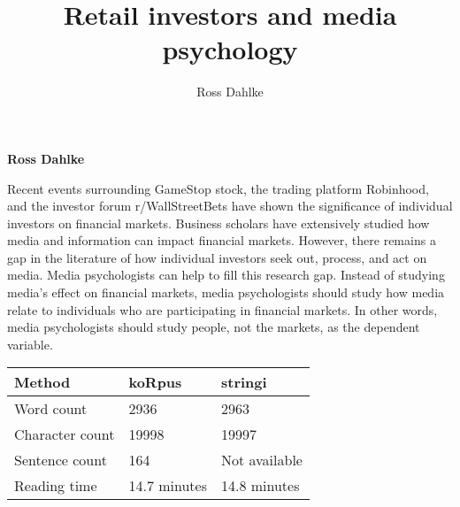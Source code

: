 \documentclass[12pt,]{article}
\title{Retail investors and media psychology  }
\author{\Large Ross Dahlke\vspace{0.05in} \newline\normalsize\emph{}  }
\date{}
\newcommand*{\authorfont}{\fontfamily{phv}\selectfont}
\renewenvironment{abstract}
 {{%
    \setlength{\leftmargin}{0mm}
    \setlength{\rightmargin}{\leftmargin}%
  }%
  \relax}
 {\endlist}
\begin{document}
	
%

{%
\setlength{\parindent}{0pt}
\thispagestyle{plain}
{\fontsize{18}{20}\selectfont\raggedright 
\maketitle  %

}

{
   \vskip 13.5pt\relax \normalsize\fontsize{11}{12} 
\textbf{\authorfont Ross Dahlke} \hskip 15pt \emph{\small }   

}

}








\begin{abstract}

    \hbox{\vrule height .2pt width 39.14pc}

    \vskip 8.5pt %

\noindent Recent events surrounding GameStop stock, the trading platform
Robinhood, and the investor forum r/WallStreetBets have shown the
significance of individual investors on financial markets. Business
scholars have extensively studied how media and information can impact
financial markets. However, there remains a gap in the literature of how
individual investors seek out, process, and act on media. Media
psychologists can help to fill this research gap. Instead of studying
media's effect on financial markets, media psychologists should study
how media relate to individuals who are participating in financial
markets. In other words, media psychologists should study people, not
the markets, as the dependent variable.


    \hbox{\vrule height .2pt width 39.14pc}


\end{abstract}


\vskip -8.5pt



\noindent \doublespacing 

\begin{longtable}[]{@{}lll@{}}
\toprule
Method & koRpus & stringi\tabularnewline
\midrule
\endhead
Word count & 2936 & 2963\tabularnewline
Character count & 19998 & 19997\tabularnewline
Sentence count & 164 & Not available\tabularnewline
Reading time & 14.7 minutes & 14.8 minutes\tabularnewline
\bottomrule
\end{longtable}
\end{document}
